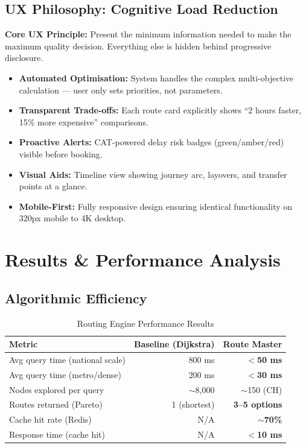 \documentclass[12pt,a4paper]{report}
\begin{document}
\section{UX Philosophy: Cognitive Load Reduction}

\begin{tcolorbox}[keybox]
\textbf{Core UX Principle:} Present the minimum information needed to make the maximum quality decision. Everything else is hidden behind progressive disclosure.
\end{tcolorbox}

\begin{itemize}[leftmargin=1.5em]
  \item \textbf{Automated Optimisation:} System handles the complex multi-objective calculation --- user only sets priorities, not parameters.
  \item \textbf{Transparent Trade-offs:} Each route card explicitly shows ``2 hours faster, 15\% more expensive'' comparisons.
  \item \textbf{Proactive Alerts:} CAT-powered delay risk badges (green/amber/red) visible before booking.
  \item \textbf{Visual Aids:} Timeline view showing journey arc, layovers, and transfer points at a glance.
  \item \textbf{Mobile-First:} Fully responsive design ensuring identical functionality on 320px mobile to 4K desktop.
\end{itemize}

\chapter{Results \& Performance Analysis}

\section{Algorithmic Efficiency}

\begin{table}[h!]
\centering
\caption{Routing Engine Performance Results}
\begin{tabular}{lrr}
\toprule
\textbf{Metric} & \textbf{Baseline (Dijkstra)} & \textbf{Route Master} \\
\midrule
Avg query time (national scale) & 800 ms & \textbf{$<$50 ms} \\
Avg query time (metro/dense) & 200 ms & \textbf{$<$30 ms} \\
Nodes explored per query & $\sim$8,000 & $\sim$150 (CH) \\
Routes returned (Pareto) & 1 (shortest) & \textbf{3--5 options} \\
Cache hit rate (Redis) & N/A & \textbf{$\sim$70\%} \\
Response time (cache hit) & N/A & \textbf{$<$10 ms} \\
\bottomrule
\end{tabular}
\end{table}
\end{document}
